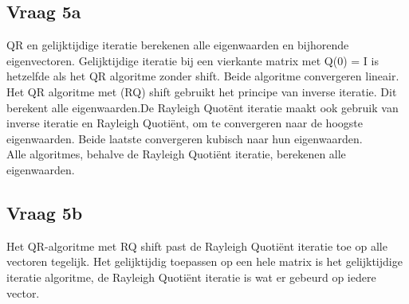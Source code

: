 \subsection*{Vraag 5a}
QR en gelijktijdige iteratie berekenen alle eigenwaarden en bijhorende eigenvectoren. Gelijktijdige iteratie bij een vierkante matrix met Q(0) = I is hetzelfde als het QR algoritme zonder shift. Beide algoritme convergeren lineair.\\ [12pt]

Het QR algoritme met (RQ) shift gebruikt het principe van inverse iteratie. Dit berekent alle eigenwaarden.De Rayleigh Quot\"ent iteratie maakt ook gebruik van inverse iteratie en Rayleigh Quoti\"ent, om te convergeren naar de hoogste eigenwaarden. Beide laatste convergeren kubisch naar hun eigenwaarden.\\ [12pt]

Alle algoritmes, behalve de Rayleigh Quoti\"ent iteratie, berekenen alle eigenwaarden.\\ [12pt]

\subsection*{Vraag 5b}
Het QR-algoritme met RQ shift past de Rayleigh Quoti\"ent iteratie toe op alle vectoren tegelijk. Het gelijktijdig toepassen op een hele matrix is het gelijktijdige iteratie algoritme, de Rayleigh Quoti\"ent iteratie is wat er gebeurd op iedere vector.\\[12pt]

